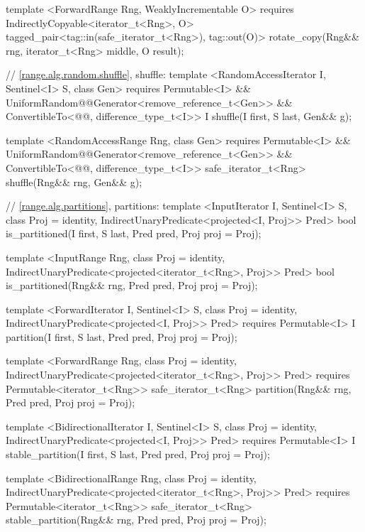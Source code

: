 {\begin{codeblock}
{{    template <ForwardRange Rng, WeaklyIncrementable O>
      requires IndirectlyCopyable<iterator_t<Rng>, O>
      tagged_pair<tag::in(safe_iterator_t<Rng>), tag::out(O)>
        rotate_copy(Rng&& rng, iterator_t<Rng> middle, O result);

    // \ref{range.alg.random.shuffle}, shuffle:
    template <RandomAccessIterator I, Sentinel<I> S, class Gen>
      requires Permutable<I> &&
        UniformRandom@@Generator<remove_reference_t<Gen>> &&
        ConvertibleTo<@@, difference_type_t<I>>
      I shuffle(I first, S last, Gen&& g);

    template <RandomAccessRange Rng, class Gen>
      requires Permutable<I> &&
        UniformRandom@@Generator<remove_reference_t<Gen>> &&
        ConvertibleTo<@@, difference_type_t<I>>
      safe_iterator_t<Rng>
        shuffle(Rng&& rng, Gen&& g);

    // \ref{range.alg.partitions}, partitions:
    template <InputIterator I, Sentinel<I> S, class Proj = identity,
        IndirectUnaryPredicate<projected<I, Proj>> Pred>
      bool is_partitioned(I first, S last, Pred pred, Proj proj = Proj{});

    template <InputRange Rng, class Proj = identity,
        IndirectUnaryPredicate<projected<iterator_t<Rng>, Proj>> Pred>
      bool is_partitioned(Rng&& rng, Pred pred, Proj proj = Proj{});

    template <ForwardIterator I, Sentinel<I> S, class Proj = identity,
        IndirectUnaryPredicate<projected<I, Proj>> Pred>
      requires Permutable<I>
      I partition(I first, S last, Pred pred, Proj proj = Proj{});

    template <ForwardRange Rng, class Proj = identity,
        IndirectUnaryPredicate<projected<iterator_t<Rng>, Proj>> Pred>
      requires Permutable<iterator_t<Rng>>
      safe_iterator_t<Rng>
        partition(Rng&& rng, Pred pred, Proj proj = Proj{});

    template <BidirectionalIterator I, Sentinel<I> S, class Proj = identity,
        IndirectUnaryPredicate<projected<I, Proj>> Pred>
      requires Permutable<I>
      I stable_partition(I first, S last, Pred pred, Proj proj = Proj{});

    template <BidirectionalRange Rng, class Proj = identity,
        IndirectUnaryPredicate<projected<iterator_t<Rng>, Proj>> Pred>
      requires Permutable<iterator_t<Rng>>
      safe_iterator_t<Rng>
        stable_partition(Rng&& rng, Pred pred, Proj proj = Proj{});

}}
\end{codeblock}}
